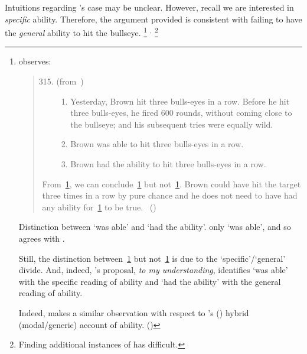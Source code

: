 \begin{note}
  Intuitions regarding \citeauthor{Boylan:2020aa}'s case may be unclear.
  However, recall we are interested in \emph{specific} ability.
  Therefore, the argument provided is consistent with \citeauthor{Boylan:2020aa} failing to have the \emph{general} ability to hit the bullseye.%
  \footnote{
    \textcite{Bhatt:2008aa} observes:
    \begin{quote}
      \begin{enumerate}[label=(\arabic*)]
        \setcounter{enumi}{314}
      \item
        (from~\cite{Thalberg:1969ta})
        \begin{enumerate}[label=\alph*., ref=(315\alph*)]
        \item
          \label{Bhatt:Thal-a}
          Yesterday, Brown hit three bulls-eyes in a row.
          Before he hit three bulls-eyes, he fired 600 rounds, without coming close to the bullseye; and his subsequent tries were equally wild.
        \item
          \label{Bhatt:Thal-b}
          Brown was able to hit three bulls-eyes in a row.
        \item
          \label{Bhatt:Thal-c}
          Brown had the ability to hit three bulls-eyes in a row.
        \end{enumerate}
      \end{enumerate}
      From~\ref{Bhatt:Thal-a}, we can conclude~\ref{Bhatt:Thal-b} but not~\ref{Bhatt:Thal-c}.
      Brown could have hit the target three times in a row by pure chance and he does not need to have had any ability for~\ref{Bhatt:Thal-b} to be true.%
      \mbox{ }\hfill\mbox{(\citeyear[167]{Bhatt:2008aa})}
    \end{quote}
    Distinction between `was able' and `had the ability'.
    \citeauthor{Boylan:2020aa} only `was able', and so agrees with \citeauthor{Bhatt:2008aa}.

    Still, the distinction between~\ref{Bhatt:Thal-b} but not~\ref{Bhatt:Thal-c} is due to the `specific'/`general' divide.
    And, indeed, \citeauthor{Bhatt:2008aa}'s proposal, \emph{to my understanding}, identifies `was able' with the specific reading of ability and `had the ability' with the general reading of ability.

    Indeed, \citeauthor{Boylan:2020aa} makes a similar observation with respect to \citeauthor{Maier:2018uo}'s (\citeyear{Maier:2018uo}) hybrid (modal/generic) account of ability. (\citeyear[23, fn.3]{Boylan:2020aa})
  }%
  \(^{,}\)%
  \footnote{
    Finding additional instances of \BoyPS{} has difficult.

}
\end{note}
